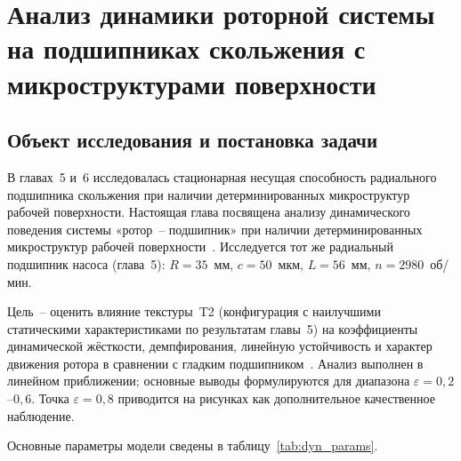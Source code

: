 \chapter{Анализ динамики роторной системы на подшипниках скольжения с микроструктурами поверхности}

\section{Объект исследования и постановка задачи}

В главах~5 и~6 исследовалась стационарная несущая способность
радиального подшипника скольжения при наличии детерминированных
микроструктур рабочей поверхности. Настоящая глава посвящена
анализу динамического поведения системы «ротор~-- подшипник»
при наличии детерминированных микроструктур рабочей поверхности~\cite{miraskari2018a,miraskari2018b,muszynska1988}.
Исследуется тот же радиальный подшипник насоса (глава~5):
$R = 35$~мм, $c = 50$~мкм, $L = 56$~мм, $n = 2980$~об/мин.

Цель~-- оценить влияние текстуры~T2 (конфигурация с наилучшими
статическими характеристиками по результатам главы~5)
на коэффициенты динамической жёсткости, демпфирования, линейную
устойчивость и характер движения ротора в сравнении с гладким
подшипником~\cite{goodwin1997,jang1999,sayed2022}. Анализ выполнен в линейном приближении; основные выводы
формулируются для диапазона $\varepsilon = 0{,}2$--$0{,}6$.
Точка $\varepsilon = 0{,}8$ приводится на рисунках как
дополнительное качественное наблюдение.

Основные параметры модели сведены в таблицу~\ref{tab:dyn_params}.

